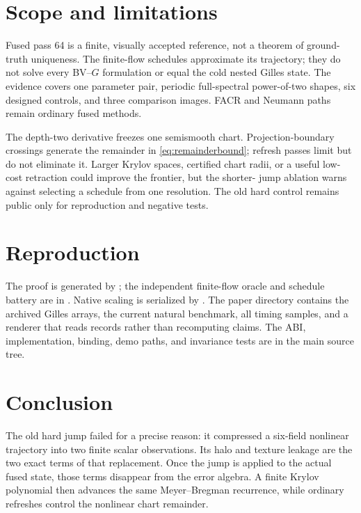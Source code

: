 \documentclass[10pt,twocolumn]{article}
\theoremstyle{definition}\newtheorem{remark}[proposition]{Remark}
\begin{document}
\section{Scope and limitations}

Fused pass 64 is a finite, visually accepted reference, not a theorem of
ground-truth uniqueness.  The finite-flow schedules approximate its
trajectory; they do not solve every BV--$G$ formulation or equal the cold
nested Gilles state.  The evidence covers one parameter pair, periodic
full-spectral power-of-two shapes, six designed controls, and three comparison
images.  FACR and Neumann paths remain ordinary fused methods.

The depth-two derivative freezes one semismooth chart.  Projection-boundary
crossings generate the remainder in \eqref{eq:remainderbound}; refresh passes
limit but do not eliminate it.  Larger Krylov spaces, certified chart radii,
or a useful low-cost retraction could improve the frontier, but the shorter-
jump ablation warns against selecting a schedule from one resolution.  The
old hard control remains public only for reproduction and negative tests.

\section{Reproduction}

The proof is generated by
; the independent
finite-flow oracle and schedule battery are in
.  Native scaling is
serialized by .  The paper
directory contains the archived Gilles arrays, the current natural benchmark,
all timing samples, and a renderer that reads records rather than recomputing
claims.  The ABI, implementation, binding, demo paths, and invariance tests are
in the main source tree.

\section{Conclusion}

The old hard jump failed for a precise reason: it compressed a six-field
nonlinear trajectory into two finite scalar observations.  Its halo and
texture leakage are the two exact terms of that replacement.  Once the jump
is applied to the actual fused state, those terms disappear from the error
algebra.  A finite Krylov polynomial then advances the same Meyer--Bregman
recurrence, while ordinary refreshes control the nonlinear chart remainder.
\end{document}
